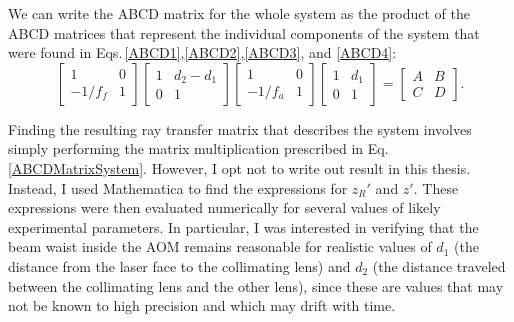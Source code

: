 We can write the ABCD matrix for the whole system as the product of the ABCD matrices that represent the individual components of the system that were found in Eqs.\,\ref{ABCD1},\ref{ABCD2},\ref{ABCD3}, and \ref{ABCD4}: 
\begin{equation}\label{ABCDMatrixSystem}
\begin{bmatrix}
1 & 0 \\ -1/f_{f} & 1
\end{bmatrix}
\begin{bmatrix}
1 & d_2-d_1 \\ 0 & 1
\end{bmatrix}
\begin{bmatrix}
1 & 0 \\ -1/f_{a} & 1
\end{bmatrix}
\begin{bmatrix}
1 & d_1 \\ 0 & 1
\end{bmatrix}
=
\begin{bmatrix}
A & B \\ C & D
\end{bmatrix}.
\end{equation}

Finding the resulting ray transfer matrix that describes the system involves simply performing the matrix multiplication prescribed in Eq.\,\ref{ABCDMatrixSystem}. However, I opt not to write out result in this thesis. Instead, I used Mathematica to find the expressions for $z_R'$ and $z'$. These expressions were then evaluated numerically for several values of likely experimental parameters. In particular, I was interested in verifying that the beam waist inside the AOM remains reasonable for realistic values of $d_1$ (the distance from the laser face to the collimating lens) and $d_2$ (the distance traveled between the collimating lens and the other lens), since these are values that may not be known to high precision and which may drift with time. %

